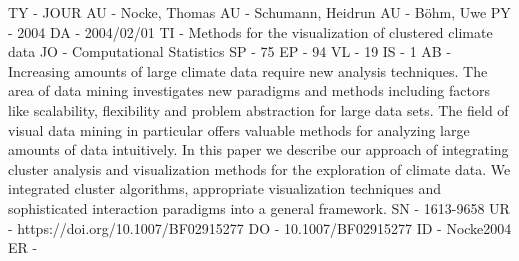 TY  - JOUR
AU  - Nocke, Thomas
AU  - Schumann, Heidrun
AU  - Böhm, Uwe
PY  - 2004
DA  - 2004/02/01
TI  - Methods for the visualization of clustered climate data
JO  - Computational Statistics
SP  - 75
EP  - 94
VL  - 19
IS  - 1
AB  - Increasing amounts of large climate data require new analysis techniques. The area of data mining investigates new paradigms and methods including factors like scalability, flexibility and problem abstraction for large data sets. The field of visual data mining in particular offers valuable methods for analyzing large amounts of data intuitively. In this paper we describe our approach of integrating cluster analysis and visualization methods for the exploration of climate data. We integrated cluster algorithms, appropriate visualization techniques and sophisticated interaction paradigms into a general framework.
SN  - 1613-9658
UR  - https://doi.org/10.1007/BF02915277
DO  - 10.1007/BF02915277
ID  - Nocke2004
ER  - 
